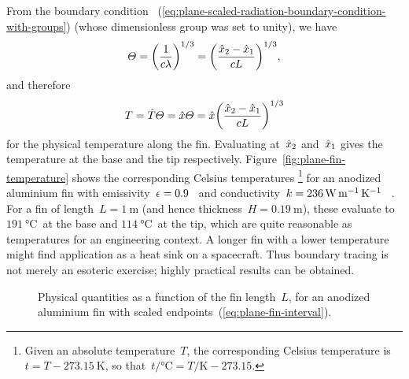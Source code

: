\begin{figure}
\end{figure}

From the boundary condition~%
  (\ref{eq:plane-scaled-radiation-boundary-condition-with-groups})
(whose dimensionless group was set to unity),
we have
\begin{equation}
  \Theta
    = \roundbr*{\frac{1}{c \lambda}}^{1/3}
    = \roundbr*{\frac{\scaled{x}_2 - \scaled{x}_1}{c L}}^{1/3},
  \label{eq:plane-fin-length-scale}
\end{equation}
and therefore
\begin{equation}
  T = \scaled{T} \Theta
    = \scaled{x} \Theta
    = \scaled{x} \roundbr*{\frac{\scaled{x}_2 - \scaled{x}_1}{c L}}^{1/3}
  \label{eq:plane-fin-temperature}
\end{equation}
for the physical temperature along the fin.
Evaluating at~$\hat{x}_2$ and~$\hat{x}_1$
gives the temperature at the base and the tip respectively.
Figure~\ref{fig:plane-fin-temperature} shows
the corresponding Celsius temperatures%
\footnote{
  Given an absolute temperature~$T$,
  the corresponding Celsius temperature is~$t = T - \SI{273.15}{\kelvin}$,
  so that~$t / \si{\degreeCelsius} = T / \si{\kelvin} - 273.15$.
}
for an anodized aluminium fin
with emissivity~$\epsilon = 0.9$~%
  \cite[Figure~4]{wade-2003-high-emissivity-aluminium-anodizing}
and conductivity~$k = \SI{236}{\watt \per\metre \per\kelvin}$~%
  \cite[Figure~1]{cook-1975-thermal-electrical-conductivity-aluminium}.
For a fin of length~$L = \SI{1}{\metre}$
(and hence thickness~$H = \SI{0.19}{\metre}$),
these evaluate to $\SI{191}{\degreeCelsius}$~at the base
and $\SI{114}{\degreeCelsius}$~at the tip,
which are quite reasonable as temperatures for an engineering context.
A longer fin with a lower temperature might find application
as a heat sink on a spacecraft.
Thus boundary tracing is not merely an esoteric exercise;
highly practical results can be obtained.

\begin{figure}
  \newcommand*{\subfigurewidth}{0.48\textwidth}
  \centering
  \hspace*{\fill}
  \begin{subfigure}[t]{\subfigurewidth}
  \end{subfigure}
    \hfill
  \begin{subfigure}[t]{\subfigurewidth}
  \end{subfigure}
  \hspace*{\fill}
  \caption{
    Physical quantities as a function of the fin length~$L$,
    for an anodized aluminium fin
    with scaled endpoints~(\ref{eq:plane-fin-interval}).
  }
  \label{fig:plane-fin-quantities}
\end{figure}

